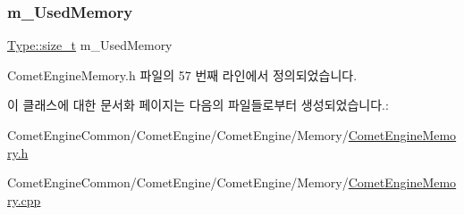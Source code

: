 \subsubsection{\texorpdfstring{m\+\_\+\+Used\+Memory}{m\_UsedMemory}}
{\footnotesize\ttfamily \hyperlink{namespace_comet_engine_1_1_type_a7c94ea6f8948649f8d181ae55911eeaf}{Type\+::size\+\_\+t} m\+\_\+\+Used\+Memory\hspace{0.3cm}{\ttfamily [protected]}}



Comet\+Engine\+Memory.\+h 파일의 57 번째 라인에서 정의되었습니다.



이 클래스에 대한 문서화 페이지는 다음의 파일들로부터 생성되었습니다.\+:\begin{DoxyCompactItemize}
\item 
Comet\+Engine\+Common/\+Comet\+Engine/\+Comet\+Engine/\+Memory/\hyperlink{_comet_engine_memory_8h}{Comet\+Engine\+Memory.\+h}\item 
Comet\+Engine\+Common/\+Comet\+Engine/\+Comet\+Engine/\+Memory/\hyperlink{_comet_engine_memory_8cpp}{Comet\+Engine\+Memory.\+cpp}\end{DoxyCompactItemize}
